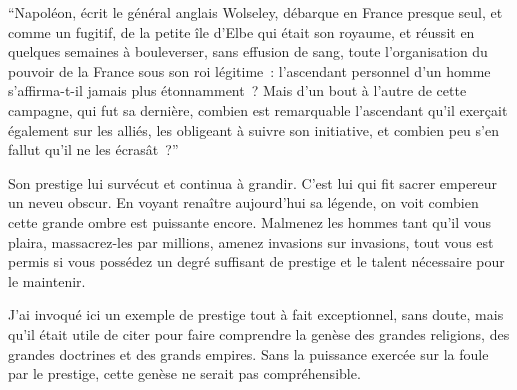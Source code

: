 \documentclass[french,twoside]{book} %
\begin{document}
“Napoléon, écrit le général anglais Wolseley, débarque en France presque seul, et comme un fugitif, de la petite île d’Elbe qui était son royaume, et réussit en quelques semaines à bouleverser, sans effusion de sang, toute l’organisation du pouvoir de la France sous son roi légitime : l’ascendant personnel d’un homme s’affirma-t-il jamais plus étonnamment ? Mais d’un bout à l’autre de cette campagne, qui fut sa dernière, combien est remarquable l’ascendant qu’il exerçait également sur les alliés, les obligeant à suivre son initiative, et combien peu s’en fallut qu’il ne les écrasât ?”\par
Son prestige lui survécut et continua à grandir. C’est lui qui fit sacrer empereur un neveu obscur. En voyant renaître aujourd’hui sa légende, on voit combien cette grande ombre est puissante encore. Malmenez les hommes tant qu’il vous plaira, massacrez-les par mil­lions, amenez invasions sur invasions, tout vous est permis si vous possédez un degré suffisant de prestige et le talent nécessaire pour le maintenir.\par
J’ai invoqué ici un exemple de prestige tout à fait exceptionnel, sans doute, mais qu’il était utile de citer pour faire comprendre la genèse des grandes religions, des grandes doctrines et des grands empires. Sans la puissance exercée sur la foule par le prestige, cette genèse ne serait pas compréhensible.\par
\end{document}
